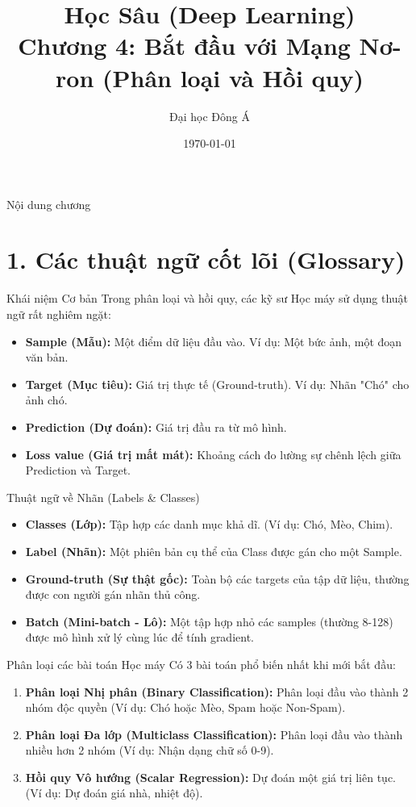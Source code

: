 \documentclass[aspectratio=169]{beamer}
\title[Chương 4: Phân loại \& Hồi quy]{Học Sâu (Deep Learning) \\ \vspace{0.5cm} \Large Chương 4: Bắt đầu với Mạng Nơ-ron (Phân loại và Hồi quy)}
\author{Đại học Đông Á}
\date{\today}
\begin{document}
\begin{frame}
    \titlepage
\end{frame}

\begin{frame}{Nội dung chương}
    \tableofcontents
\end{frame}

\section{1. Các thuật ngữ cốt lõi (Glossary)}

\begin{frame}{Khái niệm Cơ bản}
    Trong phân loại và hồi quy, các kỹ sư Học máy sử dụng thuật ngữ rất nghiêm ngặt:
    \begin{itemize}
        \item \textbf{Sample (Mẫu):} Một điểm dữ liệu đầu vào. Ví dụ: Một bức ảnh, một đoạn văn bản.
        \item \textbf{Target (Mục tiêu):} Giá trị thực tế (Ground-truth). Ví dụ: Nhãn "Chó" cho ảnh chó.
        \item \textbf{Prediction (Dự đoán):} Giá trị đầu ra từ mô hình.
        \item \textbf{Loss value (Giá trị mất mát):} Khoảng cách đo lường sự chênh lệch giữa Prediction và Target.
    \end{itemize}
\end{frame}

\begin{frame}{Thuật ngữ về Nhãn (Labels \& Classes)}
    \begin{itemize}
        \item \textbf{Classes (Lớp):} Tập hợp các danh mục khả dĩ. (Ví dụ: Chó, Mèo, Chim).
        \item \textbf{Label (Nhãn):} Một phiên bản cụ thể của Class được gán cho một Sample.
        \item \textbf{Ground-truth (Sự thật gốc):} Toàn bộ các targets của tập dữ liệu, thường được con người gán nhãn thủ công.
        \item \textbf{Batch (Mini-batch - Lô):} Một tập hợp nhỏ các samples (thường 8-128) được mô hình xử lý cùng lúc để tính gradient.
    \end{itemize}
\end{frame}

\begin{frame}{Phân loại các bài toán Học máy}
    Có 3 bài toán phổ biến nhất khi mới bắt đầu:
    \begin{enumerate}
        \item \textbf{Phân loại Nhị phân (Binary Classification):} Phân loại đầu vào thành 2 nhóm độc quyền (Ví dụ: Chó hoặc Mèo, Spam hoặc Non-Spam).
        \item \textbf{Phân loại Đa lớp (Multiclass Classification):} Phân loại đầu vào thành nhiều hơn 2 nhóm (Ví dụ: Nhận dạng chữ số 0-9).
        \item \textbf{Hồi quy Vô hướng (Scalar Regression):} Dự đoán một giá trị liên tục. (Ví dụ: Dự đoán giá nhà, nhiệt độ).
    \end{enumerate}
\end{frame}
\end{document}
